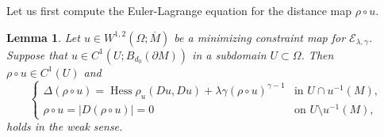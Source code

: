 \documentclass[11pt]{amsart}
\newcommand{\cE}{{\mathcal E}}
\newcommand{\Hess}{\operatorname{Hess}}
\theoremstyle{plain}
\newtheorem{lem}[thm]{Lemma}
\theoremstyle{definition}
\theoremstyle{remark}
\numberwithin{equation}{section}
\begin{document}
Let us first compute the Euler-Lagrange equation for the distance map $\rho\circ u$.

\begin{lem}\label{lem:dist-pde}
    Let $u\in W^{1,2}(\Omega;\overline M)$ be a minimizing constraint map for $\cE_{\lambda,\gamma}$. Suppose that $u\in C^1(U;{B_{d_0}(\partial M)})$ in a subdomain $U\subset\Omega$. Then $\rho\circ u \in C^1(U)$ and  
\begin{equation}\label{eq:dist-pde}
\begin{cases}
\Delta(\rho\circ u) = \Hess\rho_u(Du,Du) + \lambda\gamma(\rho\circ u)^{\gamma-1} & \text{in }U\cap u^{-1}(M), \\
\rho\circ u = |D(\rho\circ u)| = 0 & \text{on }U\setminus u^{-1}(M),
\end{cases}
\end{equation}
holds in the weak sense.  
\end{lem}
\end{document}

